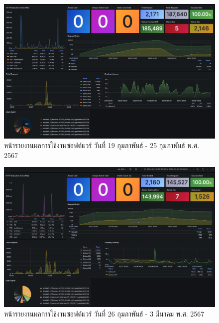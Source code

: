 \documentclass[12pt,one side,openright,a4paper]{cpe-thesis-th}
\begin{document}
\begin{figure}[H]
  \centering
  \includegraphics[width=15cm]{figure/results/grafana/grafana-feb19-feb25.png}
  \caption[หน้ารายงานผลการใช้งานซอฟต์แวร์ วันที่ 19 กุมภาพันธ์ - 25 กุมภาพันธ์ พ.ศ. 2567]{หน้ารายงานผลการใช้งานซอฟต์แวร์ วันที่ 19 กุมภาพันธ์ - 25 กุมภาพันธ์ พ.ศ. 2567}
  \label{fig:res-grafana-f19f25}
\end{figure}

\begin{figure}[H]
  \centering
  \includegraphics[width=15cm]{figure/results/grafana/grafana-feb26-mar03.png}
  \caption[หน้ารายงานผลการใช้งานซอฟต์แวร์ วันที่ 26 กุมภาพันธ์ - 3 มีนาคม พ.ศ. 2567]{หน้ารายงานผลการใช้งานซอฟต์แวร์ วันที่ 26 กุมภาพันธ์ - 3 มีนาคม พ.ศ. 2567}
  \label{fig:res-grafana-f26m03}
\end{figure}
\end{document}

